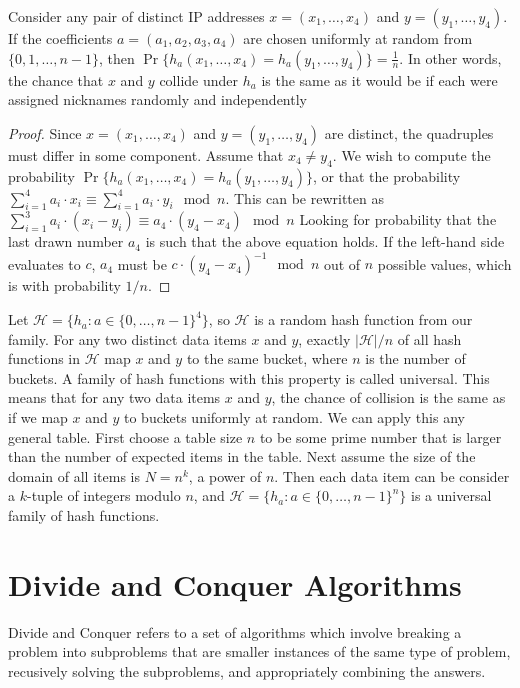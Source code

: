 \begin{thm}
  Consider any pair of distinct IP addresses $x=(x_1, \dots, x_4)$ and $y=(y_1,\dots,y_4)$.
  If the coefficients $a=(a_1, a_2, a_3, a_4)$ are chosen uniformly at random from $\{0, 1, \dots, n-1\}$, then $\Pr\{h_a(x_1, \dots, x_4) = h_a(y_1, \dots, y_4)\} = \frac{1}{n}$.
	In other words, the chance that $x$ and $y$ collide under $h_a$ is the same as it would be if each were assigned nicknames randomly and independently
\end{thm}
\begin{proof}
  Since $x=(x_1, \dots, x_4)$ and $y=(y_1, \dots, y_4)$ are distinct, the quadruples must differ in some component.
  Assume that $x_4 \not = y_4$.
  We wish to compute the probability $\Pr\{h_a(x_1, \dots, x_4) = h_a(y_1, \dots, y_4)\}$, or that the probability $\sum_{i=1}^4 a_i \cdot x_i \equiv \sum_{i=1}^4 a_i \cdot y_i \mod n$. This can be rewritten as $\sum_{i=1}^3 a_i \cdot (x_i - y_i) \equiv a_4 \cdot(y_4 - x_4) \mod n$ Looking for probability that the last drawn number $a_4$ is such that the above equation holds. If the left-hand side evaluates to $c$, $a_4$ must be $c \cdot (y_4 - x_4)^{-1} \mod n$ out of $n$ possible values, which is with probability $1/n$.
\end{proof}
Let $\mathcal{H} = \{h_a : a \in \{0, \dots, n-1\}^4\}$, so $\mathcal{H}$ is a random hash function from our family.
For any two distinct data items $x$ and $y$, exactly $|\mathcal{H}|/n$ of all hash functions in $\mathcal{H}$ map $x$ and $y$ to the same bucket, where $n$ is the number of buckets. A family of hash functions with this property is called universal.
This means that for any two data items $x$ and $y$, the chance of collision is the same as if we map $x$ and $y$ to buckets uniformly at random.
We can apply this any general table.
First choose a table size $n$ to be some prime number that is larger than the number of expected items in the table.
Next assume the size of the domain of all items is $N = n^k$, a power of $n$.
Then each data item can be consider a $k$-tuple of integers modulo $n$, and $\mathcal{H} = \{h_a : a \in \{0, \dots, n-1\}^n\}$ is a universal family of hash functions.
\newpage

\section{Divide and Conquer Algorithms}
Divide and Conquer refers to a set of algorithms which involve breaking a problem into subproblems that are smaller instances of the same type of problem, recusively solving the subproblems, and appropriately combining the answers.

